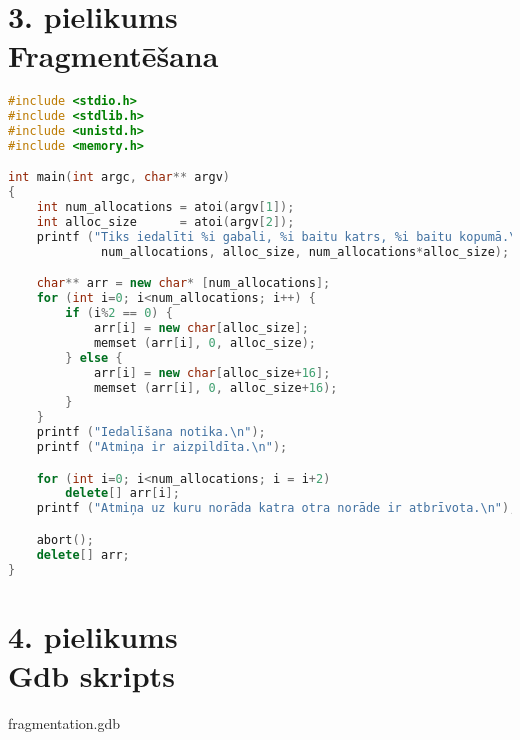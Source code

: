 \newpage
\chapter[3. pielikums. Fragmentēšana] {3. pielikums \\  Fragmentēšana}


\begin{lstlisting}[language=C++]
#include <stdio.h>
#include <stdlib.h>
#include <unistd.h>
#include <memory.h>

int main(int argc, char** argv)
{
	int num_allocations = atoi(argv[1]);
	int alloc_size      = atoi(argv[2]);
	printf ("Tiks iedalīti %i gabali, %i baitu katrs, %i baitu kopumā.\n",
	         num_allocations, alloc_size, num_allocations*alloc_size);

	char** arr = new char* [num_allocations];
	for (int i=0; i<num_allocations; i++) {
		if (i%2 == 0) {
			arr[i] = new char[alloc_size];
			memset (arr[i], 0, alloc_size);
		} else {
			arr[i] = new char[alloc_size+16];
			memset (arr[i], 0, alloc_size+16);
		}
	}
	printf ("Iedalīšana notika.\n");
	printf ("Atmiņa ir aizpildīta.\n");

	for (int i=0; i<num_allocations; i = i+2)
		delete[] arr[i];
	printf ("Atmiņa uz kuru norāda katra otra norāde ir atbrīvota.\n");

	abort();
	delete[] arr;
} 
\end{lstlisting}


\newpage
\chapter[4. pielikums. Gdb skripts] {4. pielikums \\  Gdb skripts}
{fragmentation.gdb}
